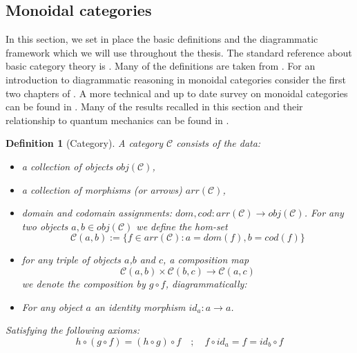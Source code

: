 \documentclass{article}
\newtheorem{definition}{Definition}
\newcommand{\cat}{\mathcal{C}}
\begin{document}
\subsection{Monoidal categories}\label{Monoidalcategories}
In this section, we set in place the basic definitions and the diagrammatic framework which we will use throughout the thesis. The standard reference about basic category theory is \cite{MacLane71}. Many of the definitions are taken from \cite{Abramsky11}. For an introduction to diagrammatic reasoning in monoidal categories consider the first two chapters of \cite{Coecke17}. A more technical and up to date survey on monoidal categories can be found in \cite{Etingof15}. Many of the results recalled in this section and their relationship to quantum mechanics can be found in \cite{Vicary12}.
\begin{definition}[Category]
	A category $\cat$ consists of the data:
	\begin{itemize}
		\item a collection of objects $obj(\cat)$,
		\item a collection of morphisms (or arrows) $arr(\cat)$,
		\item domain and codomain assignments: $dom, cod: arr(\cat) \rightarrow obj(\cat)$. For any two objects $a,b \in obj(\cat)$ we define the hom-set 
		$$ \cat (a,b) := \{ f \in arr(\cat) : a= dom(f), b=cod(f) \}$$
		\item for any triple of objects $a$,$b$ and $c$, a composition map 
		$$ \cat (a,b) \times \cat (b,c) \rightarrow \cat (a,c)$$
		we denote the composition by $g \circ f$, diagrammatically:
		\begin{center}
		\end{center}
		\item For any object $a$ an identity morphism $id_a: a \rightarrow a$. 
	\end{itemize}
	Satisfying the following axioms:
	\begin{equation*}
		h \circ (g \circ f) = (h \circ g) \circ f \quad; \quad f \circ id_a = f = id_b \circ f
	\end{equation*}	
\end{definition}
\end{document}
